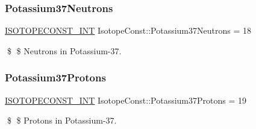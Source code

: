 \subsubsection{\texorpdfstring{Potassium37\+Neutrons}{Potassium37Neutrons}}
{\footnotesize\ttfamily \mbox{\hyperlink{group___isotope_const-_macros_ga5f18360b3e99483a35c32d789e62621c}{I\+S\+O\+T\+O\+P\+E\+C\+O\+N\+S\+T\+\_\+\+I\+NT}} Isotope\+Const\+::\+Potassium37\+Neutrons = 18}

\$ \$ Neutrons in Potassium-\/37. \mbox{\label{group___isotope_const-_potassium-_k37_ga185dc5f6e62daa1b79666e6ab6a5e16b}} 
\subsubsection{\texorpdfstring{Potassium37\+Protons}{Potassium37Protons}}
{\footnotesize\ttfamily \mbox{\hyperlink{group___isotope_const-_macros_ga5f18360b3e99483a35c32d789e62621c}{I\+S\+O\+T\+O\+P\+E\+C\+O\+N\+S\+T\+\_\+\+I\+NT}} Isotope\+Const\+::\+Potassium37\+Protons = 19}

\$ \$ Protons in Potassium-\/37. 